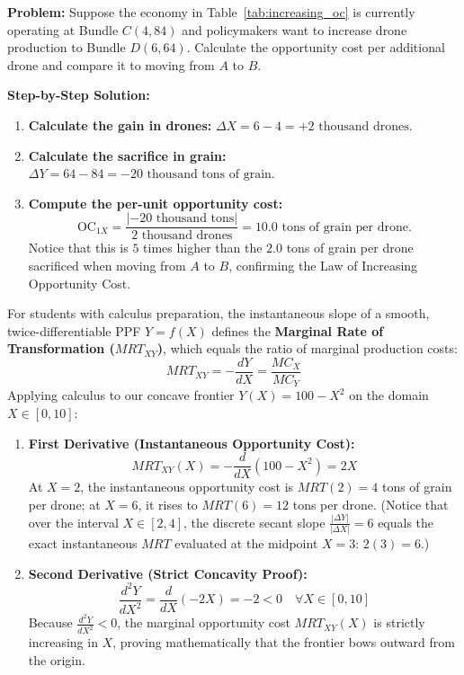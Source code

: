 \documentclass[11pt,letterpaper]{article}
\begin{document}
\begin{casestudy}
\textbf{Problem:} Suppose the economy in Table~\ref{tab:increasing_oc} is currently operating at Bundle $C(4, 84)$ and policymakers want to increase drone production to Bundle $D(6, 64)$. Calculate the opportunity cost per additional drone and compare it to moving from $A$ to $B$.

\medskip
\noindent\textbf{Step-by-Step Solution:}
\begin{enumerate}
    \item \textbf{Calculate the gain in drones:} $\Delta X = 6 - 4 = +2\text{ thousand drones}$.
    \item \textbf{Calculate the sacrifice in grain:} $\Delta Y = 64 - 84 = -20\text{ thousand tons of grain}$.
    \item \textbf{Compute the per-unit opportunity cost:}
    $$\text{OC}_{1X} = \frac{|-20\text{ thousand tons}|}{2\text{ thousand drones}} = 10.0\text{ tons of grain per drone}.$$
    Notice that this is $5$ times higher than the $2.0$ tons of grain per drone sacrificed when moving from $A$ to $B$, confirming the Law of Increasing Opportunity Cost.
\end{enumerate}
\end{casestudy}

\begin{casestudy}
For students with calculus preparation, the instantaneous slope of a smooth, twice-differentiable PPF $Y = f(X)$ defines the \textbf{Marginal Rate of Transformation ($MRT_{XY}$)}, which equals the ratio of marginal production costs:
$$MRT_{XY} = -\frac{dY}{dX} = \frac{MC_X}{MC_Y}$$
Applying calculus to our concave frontier $Y(X) = 100 - X^2$ on the domain $X \in [0, 10]$:
\begin{enumerate}
    \item \textbf{First Derivative (Instantaneous Opportunity Cost):}
    $$MRT_{XY}(X) = -\frac{d}{dX}(100 - X^2) = 2X$$
    At $X = 2$, the instantaneous opportunity cost is $MRT(2) = 4$ tons of grain per drone; at $X = 6$, it rises to $MRT(6) = 12$ tons per drone. (Notice that over the interval $X \in [2, 4]$, the discrete secant slope $\frac{|\Delta Y|}{|\Delta X|} = 6$ equals the exact instantaneous $MRT$ evaluated at the midpoint $X = 3$: $2(3) = 6$.)
    \item \textbf{Second Derivative (Strict Concavity Proof):}
    $$\frac{d^2 Y}{dX^2} = \frac{d}{dX}(-2X) = -2 < 0 \quad \forall X \in [0, 10]$$
    Because $\frac{d^2 Y}{dX^2} < 0$, the marginal opportunity cost $MRT_{XY}(X)$ is strictly increasing in $X$, proving mathematically that the frontier bows outward from the origin.
\end{enumerate}
\end{casestudy}
\end{document}
